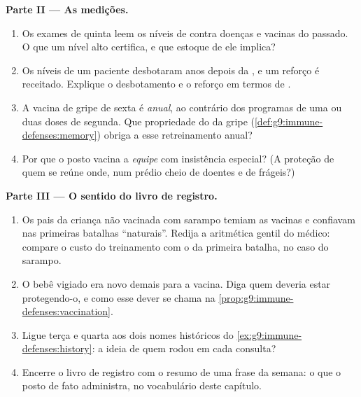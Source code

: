\begin{problem}
\medskip\noindent\textbf{Parte II --- As medições.}
\begin{enumerate}[resume]
  \item Os exames de quinta leem os níveis de 
        contra doenças e vacinas do passado. O que um nível
        alto certifica, e que estoque de  ele implica?
  \item Os níveis de um paciente desbotaram anos depois da
        , e um reforço é receitado. Explique o
        desbotamento e o reforço em termos de .
  \item A vacina de gripe de sexta é \emph{anual}, ao
        contrário dos programas de uma ou duas doses de
        segunda. Que propriedade do  da gripe
        (\cref{def:g9:immune-defenses:memory}) obriga a esse
        retreinamento anual?
  \item Por que o posto vacina a \emph{equipe} com
        insistência especial? (A proteção de quem se reúne
        onde, num prédio cheio de doentes e de frágeis?)
\end{enumerate}

\medskip\noindent\textbf{Parte III --- O sentido do livro de
registro.}
\begin{enumerate}[resume]
  \item Os pais da criança não vacinada com sarampo temiam as
        vacinas e confiavam nas primeiras batalhas
        ``naturais''. Redija a aritmética gentil do médico:
        compare o custo do treinamento com o da primeira
        batalha, no caso do sarampo.
  \item O bebê vigiado era novo demais para a vacina. Diga
        quem deveria estar protegendo-o, e como esse dever se
        chama na \cref{prop:g9:immune-defenses:vaccination}.
  \item Ligue terça e quarta aos dois nomes históricos do
        \cref{ex:g9:immune-defenses:history}: a ideia de quem
        rodou em cada consulta?
  \item Encerre o livro de registro com o resumo de uma frase
        da semana: o que o posto de fato administra, no
        vocabulário deste capítulo.
\end{enumerate}
\end{problem}
